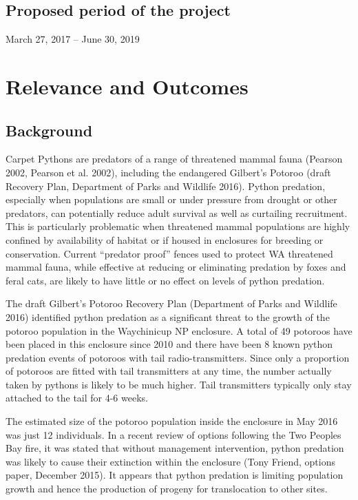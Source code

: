\documentclass[version=last,
    paper=a4,                               %
    10pt,                                   %
    dvipsnames,
    oneside,                              %
    headings=openany,                       %
    open=any,
    BCOR=7mm,                               %
    DIV=15,     %
]{scrbook}
\begin{document}
\subsection*{Proposed period of the project}
March 27, 2017 -- June 30, 2019



\section*{Relevance and Outcomes}


\subsection*{Background}

Carpet Pythons are predators of a range of threatened mammal fauna
(Pearson 2002, Pearson et al. 2002), including the endangered Gilbert's
Potoroo (draft Recovery Plan, Department of Parks and Wildlife 2016).
Python predation, especially when populations are small or under
pressure from drought or other predators, can potentially reduce adult
survival as well as curtailing recruitment. This is particularly
problematic when threatened mammal populations are highly confined by
availability of habitat or if housed in enclosures for breeding or
conservation. Current ``predator proof'' fences used to protect WA
threatened mammal fauna, while effective at reducing or eliminating
predation by foxes and feral cats, are likely to have little or no
effect on levels of python predation.

The draft Gilbert's Potoroo Recovery Plan (Department of Parks and
Wildlife 2016) identified python predation as a significant threat to
the growth of the potoroo population in the Waychinicup NP enclosure. A
total of 49 potoroos have been placed in this enclosure since 2010 and
there have been 8 known python predation events of potoroos with tail
radio-transmitters. Since only a proportion of potoroos are fitted with
tail transmitters at any time, the number actually taken by pythons is
likely to be much higher. Tail transmitters typically only stay attached
to the tail for 4-6 weeks.

The estimated size of the potoroo population inside the enclosure in May
2016 was just 12 individuals. In a recent review of options following
the Two Peoples Bay fire, it was stated that without management
intervention, python predation was likely to cause their extinction
within the enclosure (Tony Friend, options paper, December 2015). It
appears that python predation is limiting population growth and hence
the production of progeny for translocation to other sites.
\end{document}
